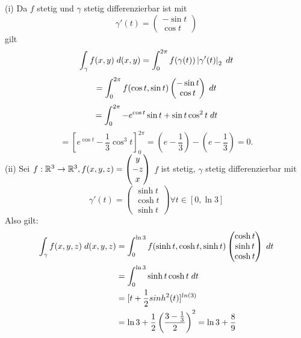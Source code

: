 \documentclass[../ana2u.tex]{subfiles}
\begin{document}
\begin{bew}
    (i) Da \(f\) stetig und \(\gamma\) stetig differenzierbar ist mit 
    \[ \gamma'(t) = \begin{pmatrix} -\sin t \\ \cos t \end{pmatrix} \]
    gilt 
    \[ \int_\gamma f(x,y)\; d(x,y) 
    = \integralx{ f(\gamma(t)) \abs{ \gamma'(t) }_2 }{0}{2\pi}{t} \]
    \[ = \integralx{ f(\cos t, \sin t) \begin{pmatrix} -\sin t \\ \cos t \end{pmatrix} }{0}{2\pi}{t} \]
    \[ = \integralx{ -e^{\cos t} \sin t + \sin t \cos^2 t }{0}{2\pi}{t} \]
    \[ = [e^{\cos t} - \frac{1}{3} \cos^3 t ]_0^{2\pi} 
    = (e - \frac{1}{3}) - (e - \frac{1}{3}) = 0. \]
    (ii) Sei \( \abb{f}{\R^3}{\R^3}, f(x,y,z) = \begin{pmatrix}  y\\-z\\x \end{pmatrix}\)
    \(f\) ist stetig, \(\gamma\) stetig differenzierbar mit
    \[ \gamma'(t) = \begin{pmatrix}
        \sinh t\\
        \cosh t\\
        \sinh t
    \end{pmatrix} \forall t \in [0, \ln 3] \]
    Also gilt:
    \begin{align*}
        \int_\gamma f(x,y,z) \; d(x,y,z)
        &= \integralx{ f(\sinh t, \cosh t, \sinh t) \begin{pmatrix} \cosh t \\ \sinh t \\ \cosh t \end{pmatrix} }{0}{\ln 3}{t}\\
        &= \integralx{ \sinh t \cosh t }{0}{\ln 3}{t}\\
        &= [t + \frac{1}{2}sinh^2(t)]^{ln(3)}\\
        &= \ln 3 + \frac{1}{2} \left(\frac{3 - \frac{1}{3}}{2}\right)^2 = \ln 3 + \frac{8}{9}
    \end{align*}
\end{bew}
\end{document}
